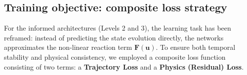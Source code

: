 \subsection{Training objective: composite loss strategy}
For the informed architectures (Levels 2 and 3), the learning task has been reframed: instead of predicting the state evolution directly, the networks approximates the non-linear reaction term $\mathbf{F}(\mathbf{u})$. To ensure both temporal stability and physical consistency, we employed a composite loss function consisting of two terms:
 a \textbf{Trajectory Loss} and a \textbf{Physics (Residual) Loss}.


